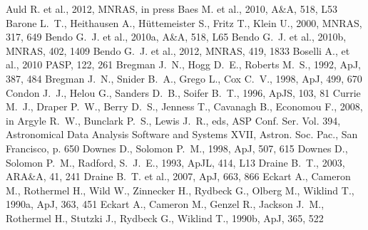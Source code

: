\documentclass[useAMS,usenatbib,usegraphicx]{mn2e}
\newcommand{\araa}{ARA\&A}             %
\newcommand{\apj}{ApJ}                 %
\newcommand{\apjl}{ApJL}               %
\newcommand{\apjs}{ApJS}               %
\newcommand{\aap}{A\&A}                %
\newcommand{\mnras}{MNRAS}             %
\newcommand{\pasp}{PASP}               %
\begin{document}
\begin{thebibliography}{}
 Auld R. et al., 2012, \mnras, in press
 Baes M. et al., 2010, \aap, 518, L53
 Barone L.~T., Heithausen A., H{\"u}ttemeister S., Fritz T., Klein U., 2000, \mnras, 317, 649
 Bendo G.~J. et al., 2010a, \aap, 518, L65
 Bendo G.~J. et al., 2010b, \mnras, 402, 1409
 Bendo G.~J. et al., 2012, \mnras, 419, 1833
 Boselli A., et al., 2010 \pasp, 122, 261
 Bregman J.~N., Hogg D.~E., Roberts M.~S., 1992, \apj, 387, 484
 Bregman J.~N., Snider B.~A., Grego L., Cox C.~V., 1998, \apj, 499, 670
 Condon J.~J., Helou G., Sanders D.~B., Soifer B.~T., 1996, \apjs, 103, 81
 Currie M.~J., Draper P.~W., Berry D.~S., Jenness T., Cavanagh B., Economou F., 2008, in Argyle R.~W., Bunclark P.~S., Lewis J.~R., eds, ASP Conf. Ser. Vol. 394, Astronomical Data Analysis Software and Systems XVII, Astron. Soc. Pac., San Francisco, p. 650
 Downes D., Solomon P.~M., 1998, \apj, 507, 615
 Downes D., Solomon P.~M., Radford, S.~J.~E., 1993, \apjl, 414, L13
 Draine B.~T., 2003, \araa, 41, 241
 Draine B.~T. et al., 2007, \apj, 663, 866
 Eckart A., Cameron M., Rothermel H., Wild W., Zinnecker H., Rydbeck G., Olberg M., Wiklind T., 1990a, \apj, 363, 451
 Eckart A., Cameron M., Genzel R., Jackson J.~M., Rothermel H., Stutzki J., Rydbeck G., Wiklind T., 1990b, \apj, 365, 522

\end{thebibliography}
\end{document}
